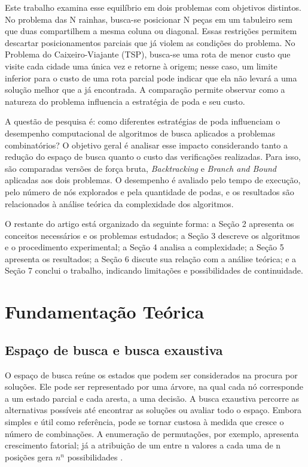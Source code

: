 \documentclass[12pt]{article}
\begin{document}
Este trabalho examina esse equilíbrio em dois problemas com objetivos distintos. No problema das N rainhas, busca-se posicionar N peças em um tabuleiro sem que duas compartilhem a mesma coluna ou diagonal. Essas restrições permitem descartar posicionamentos parciais que já violem as condições do problema. No Problema do Caixeiro-Viajante (TSP), busca-se uma rota de menor custo que visite cada cidade uma única vez e retorne à origem; nesse caso, um limite inferior para o custo de uma rota parcial pode indicar que ela não levará a uma solução melhor que a já encontrada. A comparação permite observar como a natureza do problema influencia a estratégia de poda e seu custo.

A questão de pesquisa é: como diferentes estratégias de poda influenciam o desempenho computacional de algoritmos de busca aplicados a problemas combinatórios? O objetivo geral é analisar esse impacto considerando tanto a redução do espaço de busca quanto o custo das verificações realizadas. Para isso, são comparadas versões de força bruta, \textit{Backtracking} e \textit{Branch and Bound} aplicadas aos dois problemas. O desempenho é avaliado pelo tempo de execução, pelo número de nós explorados e pela quantidade de podas, e os resultados são relacionados à análise teórica da complexidade dos algoritmos.

O restante do artigo está organizado da seguinte forma: a Seção 2 apresenta os conceitos necessários e os problemas estudados; a Seção 3 descreve os algoritmos e o procedimento experimental; a Seção 4 analisa a complexidade; a Seção 5 apresenta os resultados; a Seção 6 discute sua relação com a análise teórica; e a Seção 7 conclui o trabalho, indicando limitações e possibilidades de continuidade.
\section{Fundamentação Teórica}

\subsection{Espaço de busca e busca exaustiva}

O espaço de busca reúne os estados que podem ser considerados na procura por soluções. Ele pode ser representado por uma árvore, na qual cada nó corresponde a um estado parcial e cada aresta, a uma decisão. A busca exaustiva percorre as alternativas possíveis até encontrar as soluções ou avaliar todo o espaço. Embora simples e útil como referência, pode se tornar custosa à medida que cresce o número de combinações. A enumeração de permutações, por exemplo, apresenta crescimento fatorial; já a atribuição de um entre n valores a cada uma de n posições gera $n^n$ possibilidades \cite{laaksonen:2018}.
\end{document}
